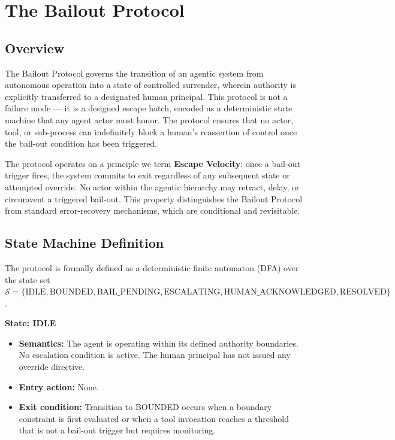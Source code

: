 \section{The Bailout Protocol}

\subsection{Overview}

The Bailout Protocol governs the transition of an agentic system from autonomous operation into a state of controlled surrender, wherein authority is explicitly transferred to a designated human principal. This protocol is not a failure mode — it is a designed escape hatch, encoded as a deterministic state machine that any agent actor must honor. The protocol ensures that no actor, tool, or sub-process can indefinitely block a human's reassertion of control once the bail-out condition has been triggered.

The protocol operates on a principle we term \textbf{Escape Velocity}: once a bail-out trigger fires, the system commits to exit regardless of any subsequent state or attempted override. No actor within the agentic hierarchy may retract, delay, or circumvent a triggered bail-out. This property distinguishes the Bailout Protocol from standard error-recovery mechanisms, which are conditional and revisitable.

\bigskip

\subsection{State Machine Definition}

The protocol is formally defined as a deterministic finite automaton (DFA) over the state set $\mathcal{S} = \{ \text{IDLE}, \text{BOUNDED}, \text{BAIL\_PENDING}, \text{ESCALATING}, \text{HUMAN\_ACKNOWLEDGED}, \text{RESOLVED} \}$.

\bigskip

\noindent\textbf{State: IDLE}

\begin{itemize}
  \item \textbf{Semantics:} The agent is operating within its defined authority boundaries. No escalation condition is active. The human principal has not issued any override directive.
  \item \textbf{Entry action:} None.
  \item \textbf{Exit condition:} Transition to BOUNDED occurs when a boundary constraint is first evaluated or when a tool invocation reaches a threshold that is not a bail-out trigger but requires monitoring.
\end{itemize}

